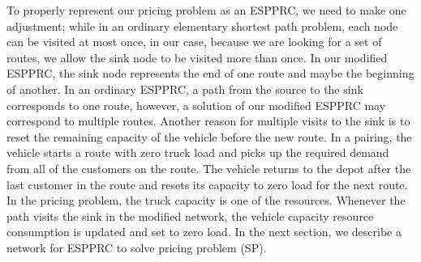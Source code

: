 To properly represent our pricing problem as an ESPPRC, we need to make one adjustment; 
while in an ordinary elementary shortest path problem, each node can be visited at most 
once, in our case, because we are looking for a set of routes, we allow the sink node to 
be visited more than once. In our modified ESPPRC, the sink node represents the end of 
one route and maybe the beginning of another. In an ordinary ESPPRC, a path from 
the source to the sink corresponds to one route, however, a solution of our modified 
ESPPRC may correspond to multiple routes. Another reason for multiple visits to the sink 
is to reset the remaining capacity of the vehicle before the new route. In a pairing, 
the vehicle starts a route with zero truck load and picks up the required demand  
from all of the customers on the route. The vehicle returns to the depot after the last 
customer in the route and resets its capacity to zero load for the next route. 
In the pricing problem, the truck capacity is one of the resources. Whenever the 
path visits the sink in the modified network, the vehicle capacity resource consumption 
is updated and set to zero load. In the next section, we describe a network
for ESPPRC to solve pricing problem (SP).

